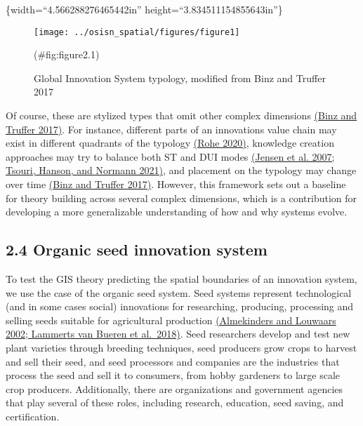 \documentclass[twoside,12pt,final]{ucthesis-CA2012}
\begin{document}
\begin{ucmainmatter}
\{width=``4.566288276465442in''
height=``3.834511154855643in''\}
\begin{figure}

{\centering \texttt{[image: ../osisn\_spatial/figures/figure1]} 

}

\caption{Global Innovation System typology, modified from Binz and Truffer 2017}(\#fig:figure2.1)
\end{figure}
Of course, these are stylized types that omit other complex dimensions
\href{https://www.zotero.org/google-docs/?qyKYFP}{(Binz and Truffer 2017)}.
For instance, different parts of an innovation\textquotesingle s value chain may exist
in different quadrants of the typology \href{https://www.zotero.org/google-docs/?q54awd}{(Rohe
2020)}, knowledge creation
approaches may try to balance both ST and DUI modes \href{https://www.zotero.org/google-docs/?nMSuJI}{(Jensen et al.
2007; Tsouri, Hanson, and Normann
2021)}, and placement on the
typology may change over time \href{https://www.zotero.org/google-docs/?3uaw1G}{(Binz and Truffer
2017)}. However, this
framework sets out a baseline for theory building across several complex
dimensions, which is a contribution for developing a more generalizable
understanding of how and why systems evolve.

\hypertarget{organic-seed-innovation-system}{%
\subsection{2.4 Organic seed innovation system}\label{organic-seed-innovation-system}}

To test the GIS theory predicting the spatial boundaries of an
innovation system, we use the case of the organic seed system. Seed
systems represent technological (and in some cases social) innovations
for researching, producing, processing and selling seeds suitable for
agricultural production \href{https://www.zotero.org/google-docs/?fCj5EV}{(Almekinders and Louwaars 2002; Lammerts van
Bueren et al.~2018)}. Seed
researchers develop and test new plant varieties through breeding
techniques, seed producers grow crops to harvest and sell their seed,
and seed processors and companies are the industries that process the
seed and sell it to consumers, from hobby gardeners to large scale crop
producers. Additionally, there are organizations and government agencies
that play several of these roles, including research, education, seed
saving, and certification.


\end{ucmainmatter}
\end{document}
